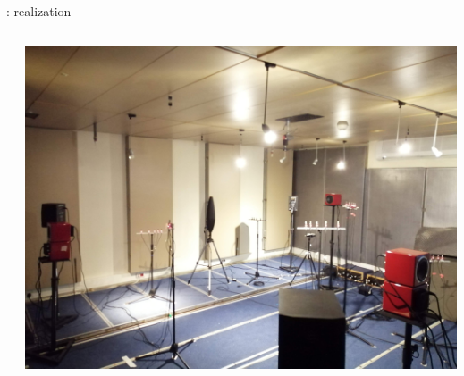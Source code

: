 \begin{frame}[t]{\dechorate: realization}
{\begin{columns}[T,onlytextwidth]
\begin{column}{0.3\textwidth}
            \end{column}\hfill
            \begin{column}{0.3\textwidth}
                \includegraphics[width=\textwidth]{figures/dechorate/panels}
            \end{column}
        \end{columns}
    }

\end{frame}



